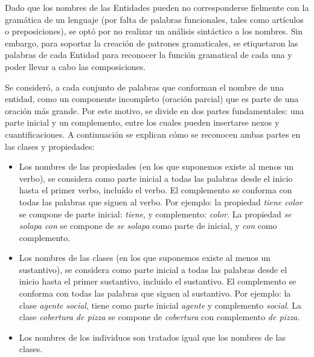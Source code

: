 Dado que los nombres de las Entidades pueden no corresponderse fielmente con la gramática de un lenguaje (por falta de palabras funcionales, tales como artículos o preposiciones), se optó por no realizar un análisis sintáctico a los nombres. Sin embargo, para soportar la creación de patrones gramaticales, se etiquetaron las palabras de cada Entidad para reconocer la función gramatical de cada una y poder llevar a cabo las composiciones.

Se consideró, a cada conjunto de palabras que conforman el nombre de una entidad, como un componente incompleto (oración parcial) que es parte de una oración más grande. Por este motivo, se divide en dos partes fundamentales: una parte inicial y un complemento, entre los cuales pueden insertarse nexos y cuantificaciones. A continuación se explican cómo se reconocen ambas partes en las clases y propiedades:
\begin{itemize}
    \item Los nombres de las propiedades (en los que suponemos existe al menos un verbo), se considera como parte inicial a todas las palabras desde el inicio hasta el primer verbo, incluído el verbo. El complemento se conforma con todas las palabras que siguen al verbo. Por ejemplo: la propiedad \emph{tiene color} se compone de parte inicial: \emph{tiene}, y complemento: \emph{color}. La propiedad \emph{se solapa con} se compone de \emph{se solapa} como parte de inicial, y \emph{con} como complemento.
    \item Los nombres de las clases (en los que suponemos existe al menos un sustantivo), se considera como parte inicial a todas las palabras desde el inicio hasta el primer sustantivo, incluido el sustantivo. El complemento se conforma con todas las palabras que siguen al sustantivo. Por ejemplo: la clase \emph{agente social}, tiene como parte inicial \emph{agente} y complemento \emph{social}. La clase \emph{cobertura de pizza} se compone de \emph{cobertura} con complemento \emph{de pizza}.
    \item Los nombres de los individuos son tratados igual que los nombres de las clases.
\end{itemize}


